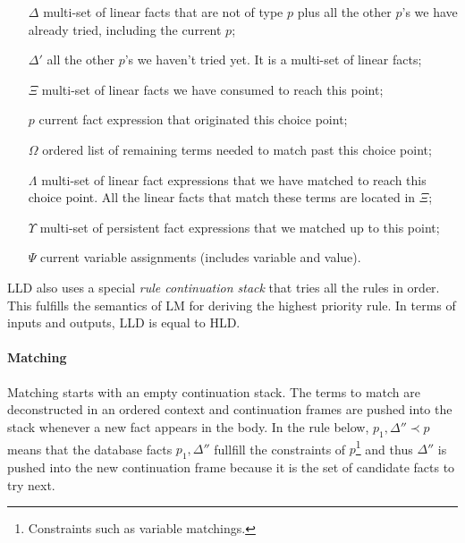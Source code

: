 \begin{enumerate}

   \item[$\Delta$] multi-set of linear facts that are not of type $p$ plus all
   the other $p$'s we have already tried, including the current $p$;

   \item[$\Delta'$] all the other $p$'s we haven't tried yet. It is a multi-set
   of linear facts;

   \item[$\Xi$] multi-set of linear facts we have consumed to reach this point;

   \item[$p$] current fact expression that originated this choice point;

   \item[$\Omega$] ordered list of remaining terms needed to match past this
   choice point;

   \item[$\Lambda$] multi-set of linear fact expressions that we have matched to
   reach this choice point. All the linear facts that match these terms are
   located in $\Xi$;

   \item[$\Upsilon$] multi-set of persistent fact expressions that we matched up
   to this point;

   \item[$\Psi$] current variable assignments (includes variable and value).

\end{enumerate}

LLD also uses a special \emph{rule continuation stack} that tries all the rules
in order. This fulfills the semantics of LM for deriving the highest priority
rule. In terms of inputs and outputs, LLD is equal to HLD.

\paragraph{Matching} Matching starts with an empty continuation stack. The terms
to match are deconstructed in an ordered context and continuation frames are
pushed into the stack whenever a new fact appears in the body. In the rule
below, $p_1, \Delta'' \prec p$ means that the database facts $p_1, \Delta''$
fullfill the constraints of $p$\footnote{Constraints such as variable
matchings.} and thus $\Delta''$ is pushed into the new continuation frame
because it is the set of candidate facts to try next.


